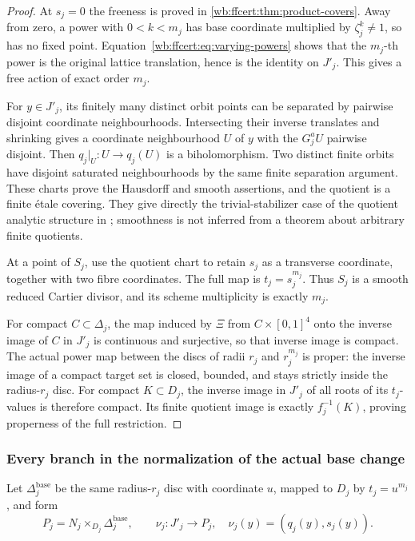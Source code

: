 \begin{proof}
At $s_j=0$ the freeness is proved in
\cref{wb:ffcert:thm:product-covers}. Away from zero, a power with
$0<k<m_j$ has base coordinate multiplied by $\zeta_j^k\ne1$, so
has no fixed point. Equation~\eqref{wb:ffcert:eq:varying-powers} shows
that the $m_j$-th power is the original lattice translation, hence is
the identity on $J'_j$. This gives a free action of exact order $m_j$.

For $y\in J'_j$, its finitely many distinct orbit points can be
separated by pairwise disjoint coordinate neighbourhoods. Intersecting
their inverse translates and shrinking gives a coordinate neighbourhood
$U$ of $y$ with the $G_j^aU$ pairwise disjoint. Then
$q_j|_U:U\to q_j(U)$ is a biholomorphism. Two distinct finite orbits
have disjoint saturated neighbourhoods by the same finite separation
argument. These charts prove the Hausdorff and smooth assertions, and
the quotient is a finite \'etale covering. They give directly the
trivial-stabilizer case of the quotient analytic structure in
\cite[conditions (I)--(II), Theorem~1]{Cartan1954Quotient}; smoothness
is not inferred from a theorem about arbitrary finite quotients.

At a point of $S_j$, use the quotient chart to retain $s_j$ as a
transverse coordinate, together with two fibre coordinates. The full
map is $t_j=s_j^{m_j}$. Thus $S_j$ is a smooth reduced Cartier
divisor, and its scheme multiplicity is exactly $m_j$.

For compact $C\subset\Delta_j$, the map induced by $\Xi$ from
$C\times[0,1]^4$ onto the inverse image of $C$ in $J'_j$ is
continuous and surjective, so that inverse image is compact. The actual
power map between the discs of radii $r_j$ and $r_j^{m_j}$ is proper:
the inverse image of a compact target set is closed, bounded, and stays
strictly inside the radius-$r_j$ disc. For compact $K\subset D_j$,
the inverse image in $J'_j$ of all roots of its $t_j$-values is
therefore compact. Its finite quotient image is exactly $f_j^{-1}(K)$,
proving properness of the full restriction.
\end{proof}

\subsubsection{Every branch in the normalization of the actual base change}

Let $\Delta_j^{\mathrm{base}}$ be the same radius-$r_j$ disc with
coordinate $u$, mapped to $D_j$ by $t_j=u^{m_j}$, and form
\[
 P_j=N_j\times_{D_j}\Delta_j^{\mathrm{base}},\qquad
 \nu_j:J'_j\longrightarrow P_j,\quad
 \nu_j(y)=(q_j(y),s_j(y)).
 \tag{FF26}\label{wb:ffcert:eq:normalization-map}
\]

